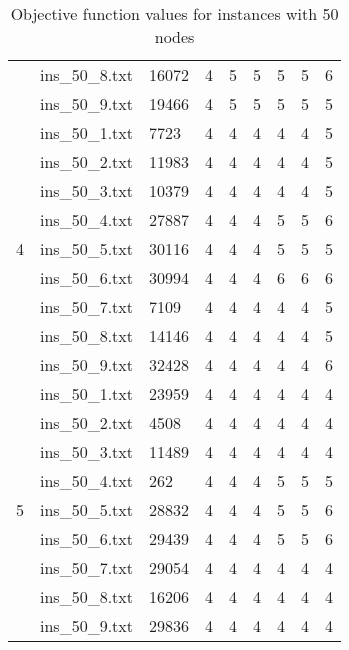 \begin{table}[]
\begin{tabular}{lllllllll}
& ins\_50\_8.txt & 16072 & 4 & 5 & 5 & 5  & 5   & 6 \\
& ins\_50\_9.txt & 19466 & 4 & 5 & 5 & 5  & 5   & 5 \\
\hline 
\multirow{9}{*}{4}
& ins\_50\_1.txt & 7723  & 4 & 4 & 4 & 4  & 4   & 5 \\
& ins\_50\_2.txt & 11983 & 4 & 4 & 4 & 4  & 4   & 5 \\
& ins\_50\_3.txt & 10379 & 4 & 4 & 4 & 4  & 4   & 5 \\
& ins\_50\_4.txt & 27887 & 4 & 4 & 4 & 5  & 5   & 6 \\
& ins\_50\_5.txt & 30116 & 4 & 4 & 4 & 5  & 5   & 5 \\
& ins\_50\_6.txt & 30994 & 4 & 4 & 4 & 6  & 6   & 6 \\
& ins\_50\_7.txt & 7109  & 4 & 4 & 4 & 4  & 4   & 5 \\
& ins\_50\_8.txt & 14146 & 4 & 4 & 4 & 4  & 4   & 5 \\
& ins\_50\_9.txt & 32428 & 4 & 4 & 4 & 4  & 4   & 6 \\
\hline 
\multirow{9}{*}{5}
& ins\_50\_1.txt & 23959 & 4 & 4 & 4 & 4  & 4   & 4 \\
& ins\_50\_2.txt & 4508  & 4 & 4 & 4 & 4  & 4   & 4 \\
& ins\_50\_3.txt & 11489 & 4 & 4 & 4 & 4  & 4   & 4 \\
& ins\_50\_4.txt & 262   & 4 & 4 & 4 & 5  & 5   & 5 \\
& ins\_50\_5.txt & 28832 & 4 & 4 & 4 & 5  & 5   & 6 \\
& ins\_50\_6.txt & 29439 & 4 & 4 & 4 & 5  & 5   & 6 \\
& ins\_50\_7.txt & 29054 & 4 & 4 & 4 & 4  & 4   & 4 \\
& ins\_50\_8.txt & 16206 & 4 & 4 & 4 & 4  & 4   & 4 \\
& ins\_50\_9.txt & 29836 & 4 & 4 & 4 & 4  & 4   & 4
\end{tabular}
\caption{Objective function values for instances with 50 nodes}
\label{tab:ins50}
\end{table}


